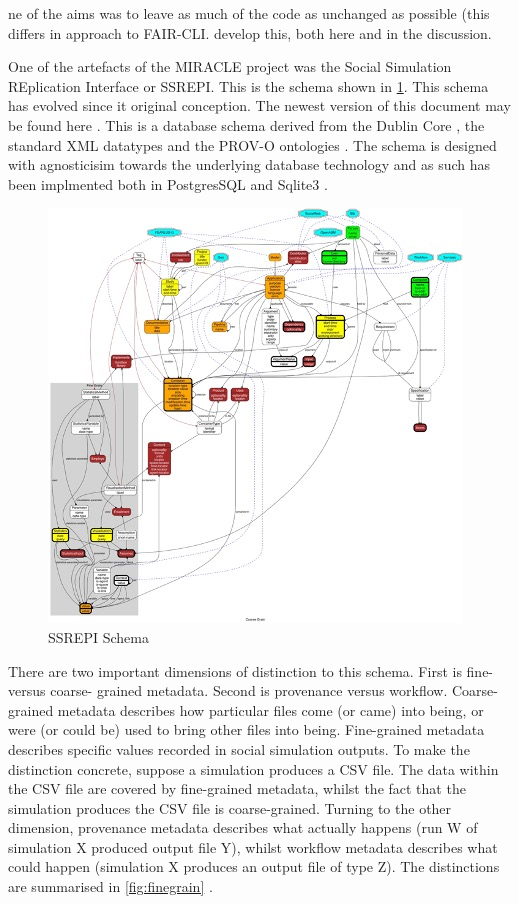\documentclass[runningheads]{llncs}
\begin{document}
ne of the aims was to leave as much of the code as unchanged as possible (this differs in approach to FAIR-CLI. develop this, both here and in the discussion.

One of the artefacts of the MIRACLE project \cite{} was the Social Simulation REplication Interface or SSREPI. This is the schema shown 
in \ref{fig:schema}. This schema has evolved since it original conception.
The newest version of this document may be found here \cite{}. This is a
database schema derived from the Dublin Core \cite{weibel2000dublin}, the
standard XML datatypes \cite{biron2004xml} and the PROV-O ontologies \cite{missier2013w3c}. The schema is designed with
agnosticisim towards the underlying database technology and as such has
been implmented both in PostgresSQL \cite{stonebraker1991postgres} and Sqlite3 \cite{sqliteorg2023syntax}.

\begin{figure}
\includegraphics[width=\textwidth]{img/schema.jpeg}
\caption{SSREPI Schema} \label{fig:schema}
\end{figure}


There are two important dimensions of distinction to this schema. First is
fine- versus coarse- grained metadata. Second is provenance versus
workflow. Coarse-grained metadata describes how particular files come (or
came) into being, or were (or could be) used to bring other files into
being. Fine-grained metadata describes specific values recorded in social
simulation outputs. To make the distinction concrete, suppose a simulation
produces a CSV file. The data within the CSV file are covered by
fine-grained metadata, whilst the fact that the simulation produces the
CSV file is coarse-grained. Turning to the other dimension, provenance
metadata describes what actually happens (run W of simulation X produced
output file Y), whilst workflow metadata describes what could happen
(simulation X produces an output file of type Z). The distinctions are
summarised in \ref{fig:finegrain} .
\end{document}
